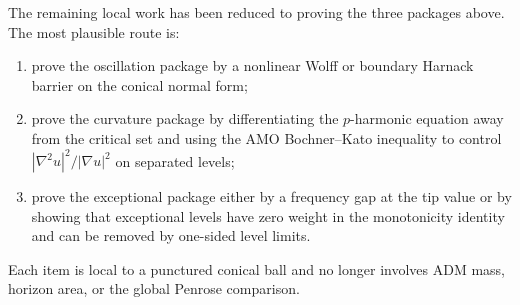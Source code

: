 \begin{remark}\label{rem:NextTipNeckTargets}
The remaining local work has been reduced to proving the three packages above.
The most plausible route is:
\begin{enumerate}
    \item prove the oscillation package by a nonlinear Wolff or boundary
    Harnack barrier on the conical normal form;
    \item prove the curvature package by differentiating the \(p\)-harmonic
    equation away from the critical set and using the AMO Bochner--Kato
    inequality to control \(|\nabla^2u|^2/|\nabla u|^2\) on separated levels;
    \item prove the exceptional package either by a frequency gap at the tip
    value or by showing that exceptional levels have zero weight in the
    monotonicity identity and can be removed by one-sided level limits.
\end{enumerate}
Each item is local to a punctured conical ball and no longer involves ADM mass,
horizon area, or the global Penrose comparison.
\end{remark}

